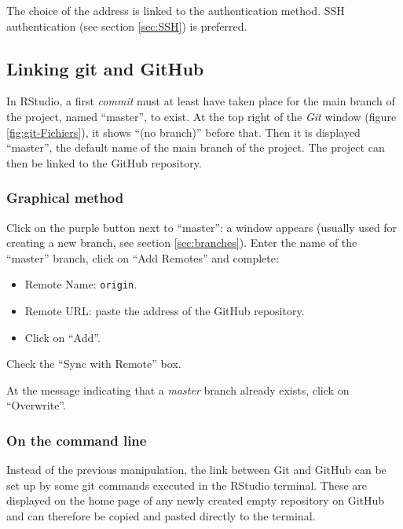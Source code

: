 \documentclass[
  12pt,
  american,
  a4paper,
  extrafontsizes,onecolumn,openright
  ]{memoir}
\providecommand{\tightlist}{%
  \setlength{\itemsep}{0pt}\setlength{\parskip}{0pt}}
\begin{document}
The choice of the address is linked to the authentication method.
SSH authentication (see section \ref{sec:SSH}) is preferred.

\subsection{Linking git and GitHub}\label{linking-git-and-github}

In RStudio, a first \emph{commit} must at least have taken place for the main branch of the project, named \enquote{master}, to exist.
At the top right of the \emph{Git} window (figure \ref{fig:git-Fichiers}), it shows \enquote{(no branch)} before that.
Then it is displayed \enquote{master}, the default name of the main branch of the project.
The project can then be linked to the GitHub repository.

\subsubsection{Graphical method}\label{graphical-method}

Click on the purple button next to \enquote{master}: a window appears (usually used for creating a new branch, see section \ref{sec:branches}).
Enter the name of the \enquote{master} branch, click on \enquote{Add Remotes} and complete:

\begin{itemize}
\tightlist
\item
  Remote Name: \texttt{origin}.
\item
  Remote URL: paste the address of the GitHub repository.
\item
  Click on \enquote{Add}.
\end{itemize}

Check the \enquote{Sync with Remote} box.

At the message indicating that a \emph{master} branch already exists, click on \enquote{Overwrite}.

\subsubsection{On the command line}\label{on-the-command-line}

Instead of the previous manipulation, the link between Git and GitHub can be set up by some git commands executed in the RStudio terminal.
These are displayed on the home page of any newly created empty repository on GitHub and can therefore be copied and pasted directly to the terminal.
\end{document}
